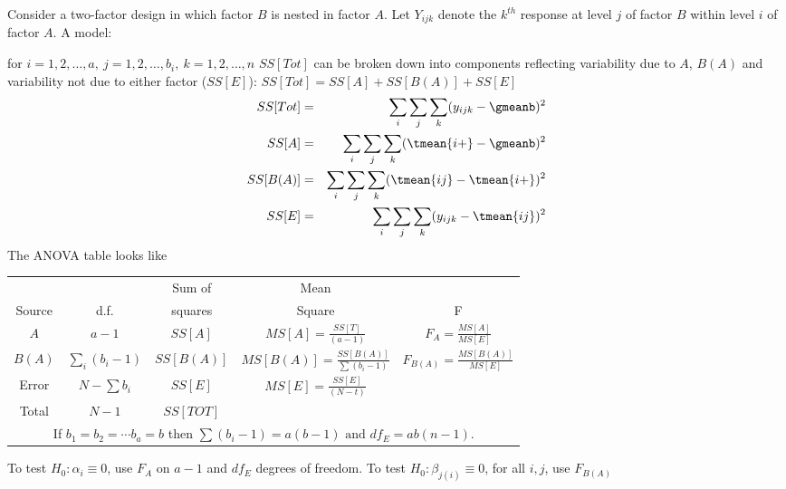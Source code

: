 \newpage
{}
Consider a two-factor design in which factor $B$ is nested in factor $A$.
Let $Y_{ijk}$ denote the $k^{th}$ response at level $j$ of factor $B$
within level $i$ of factor $A$.  A model: \\
\begin{center}
\end{center}
for $i=1,2,\ldots,a,\ j=1,2,\ldots,b_i, \ k=1,2,\ldots,n$
\bigkn
$SS[Tot]$ can be broken down into components reflecting variability 
due to $A$, $B(A)$ and variability not due to either factor ($SS[E]$):
$SS[Tot]=SS[A]+SS[B(A)]+SS[E]$ %
\begin{eqnarray*}
SS[Tot] & = &\sum_i \sum_j \sum_k (y_{ijk}-\gmeanb)^2 \\
SS[A] & = &\sum_i \sum_j \sum_k (\tmean{i+}-\gmeanb)^2 \\
SS[B(A)] & = &\sum_i \sum_j \sum_k (\tmean{ij}-\tmean{i+})^2 \\
SS[E] & = & \sum_i \sum_j \sum_k (y_{ijk}-\tmean{ij})^2 
\end{eqnarray*}
The ANOVA table looks like 
\bigkn
\begin{tabular}{|c|c|c|c|c|} \hline
& & Sum of & Mean & \\
Source & d.f. & squares & Square & F \\ \hline
$A$ & $a-1$ & $SS[A]$ & $MS[A]=\frac{SS[T]}{(a-1)}$ & $F_A=\frac{MS[A]}{MS[E]}$ \\ 
$B(A)$ & $\sum_i (b_i-1)$ & $SS[B(A)]$ & $MS[B(A)]=\frac{SS[B(A)]}{\sum(b_i-1)}$ & $F_{B(A)}=\frac{MS[B(A)]}{MS[E]}$ \\ 
Error & $N-\sum b_i$ & $SS[E]$ & $MS[E]=\frac{SS[E]}{(N-t)}$ & \\
Total & $N-1$ & $SS[TOT]$ & &\\ \hline
\multicolumn{5}{c}{If $b_1 = b_2 = \cdots b_a=b$ then 
$\sum (b_i-1) = a(b-1) \mbox{ and }df_E=ab(n-1).$}
\end{tabular}
\noindent
\newpage
{}
\bigkn
To test $H_0: \alpha_i \equiv 0$, use $F_A$ on $a-1$ and $df_E$ degrees
of freedom. 
\bigkn
To test $H_0: \beta_{j(i)} \equiv 0$, for all $i,j$, use $F_{B(A)}$ 
